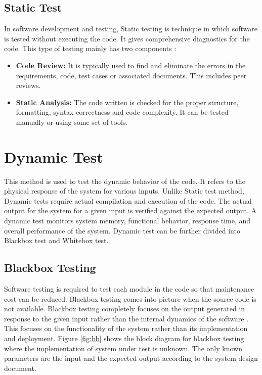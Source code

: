 \documentclass[10pt]{ruthesis}
\begin{document}
\subsection{Static Test}
In software development and testing, Static testing is technique in which software is tested without executing the code. It gives comprehensive diagnostics for the code. This type of testing mainly has two components \cite{site10}:
\begin{itemize}
	\item \textbf{Code Review:} It is typically used to find and eliminate the errors in the requirements, code, test cases or associated documents. This includes peer reviews.
	\item \textbf{Static Analysis:} The code written is checked for the proper structure, formatting, syntax correctness and code complexity. It can be tested manually or using some set of tools.
\end{itemize}

\section{Dynamic Test}
This method is used to test the dynamic behavior of the code. It refers to the physical response of the system for various inputs. Unlike Static test method, Dynamic tests require actual compilation and execution of the code. The actual output for the system for a given input is verified against the expected output. A dynamic test monitors system memory, functional behavior, response time, and overall performance of the system. Dynamic test can be further divided into Blackbox test and Whitebox test.

\subsection{Blackbox Testing}

Software testing is required to test each module in the code so that maintenance cost can be reduced. Blackbox testing comes into picture when the source code is not available. Blackbox testing completely focuses on the output generated in response to the given input rather than the internal dynamics of the software \cite{ref24}. This focuses on the functionality of the system rather than its implementation and deployment. Figure \ref{fig:bb} shows the block diagram for blackbox testing where the implementation of system under test is unknown. The only known parameters are the input and the expected output according to the system design document.
\end{document}
